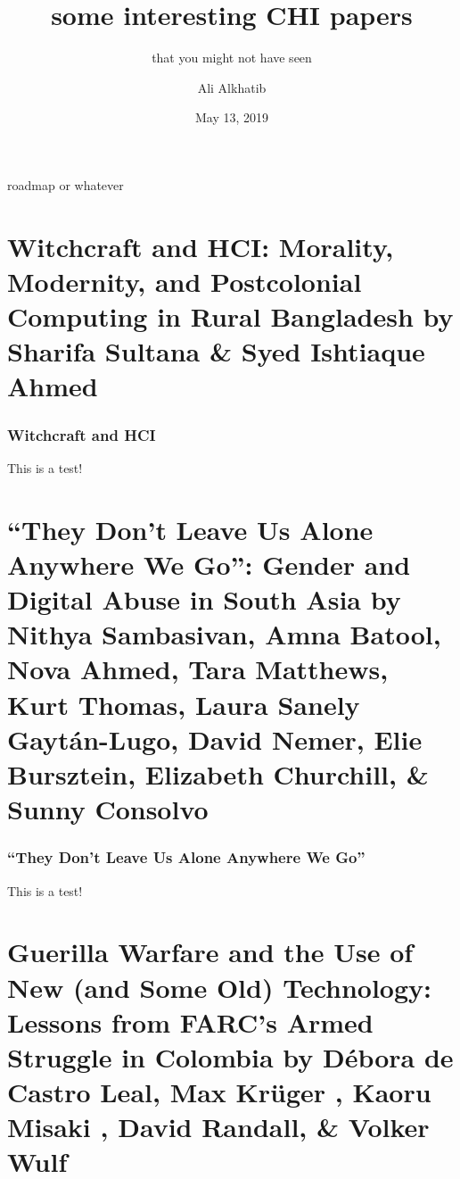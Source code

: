 \documentclass[aspectratio=169,10pt]{beamer} %
\title{some interesting CHI papers}
\subtitle{that you might not have seen}
\author{Ali Alkhatib}
\institute[RWF]{Reading With Friends}
\date{May 13, 2019}
\newcommand{\onlyinsubfile}[1]{#1}
\newcommand{\notinsubfile}[1]{}
\begin{document}
\renewcommand{\onlyinsubfile}[1]{}
\renewcommand{\notinsubfile}[1]{#1}
\begin{frame}
\titlepage
\end{frame} 




\begin{frame}{roadmap or whatever}
     \tableofcontents
\end{frame}


\section[Witchcraft and HCI: Morality, Modernity, and Postcolonial Computing in Rural Bangladesh]{Witchcraft and HCI: Morality, Modernity, and Postcolonial Computing in Rural Bangladesh {\scriptsize \color{Black} by \textbf{Sharifa Sultana} \& \textbf{Syed Ishtiaque Ahmed}}}

\begin{frame}\frametitle{Witchcraft and HCI}
This is a test!
\end{frame}



\section[``They Don’t Leave Us Alone Anywhere We Go'': Gender and Digital Abuse in South Asia]{``They Don’t Leave Us Alone Anywhere We Go'': Gender and Digital Abuse in South Asia {\scriptsize \color{Black} by \textbf{Nithya Sambasivan}, \textbf{Amna Batool}, \textbf{Nova Ahmed}, \textbf{Tara Matthews}, \textbf{Kurt Thomas}, \textbf{Laura Sanely Gaytán-Lugo}, \textbf{David Nemer}, \textbf{Elie Bursztein}, \textbf{Elizabeth Churchill}, \& \textbf{Sunny Consolvo}}}

\begin{frame}\frametitle{``They Don’t Leave Us Alone Anywhere We Go''}
This is a test!
\end{frame}



\section[Guerilla Warfare and the Use of New (and Some Old) Technology: Lessons from FARC's Armed Struggle in Colombia]{Guerilla Warfare and the Use of New (and Some Old) Technology: Lessons from FARC's Armed Struggle in Colombia {\scriptsize \color{Black} by \textbf{Débora de Castro Leal},  \textbf{Max Krüger },  \textbf{Kaoru Misaki },  \textbf{David Randall}, \& \textbf{Volker Wulf}}}
\end{document}
